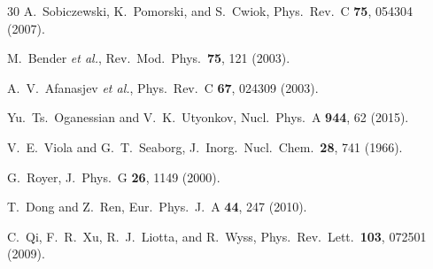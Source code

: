 \documentclass[aps,prc,twocolumn,showpacs,preprintnumbers,amsmath,amssymb]{revtex4-2}
\begin{document}
\begin{thebibliography}{30}
  A.~Sobiczewski, K.~Pomorski, and S.~Cwiok,
  Phys.\ Rev.\ C \textbf{75}, 054304 (2007).

  M.~Bender \emph{et al.},
  Rev.\ Mod.\ Phys.\ \textbf{75}, 121 (2003).

  A.~V.~Afanasjev \emph{et al.},
  Phys.\ Rev.\ C \textbf{67}, 024309 (2003).

  Yu.~Ts.~Oganessian and V.~K.~Utyonkov,
  Nucl.\ Phys.\ A \textbf{944}, 62 (2015).

  V.~E.~Viola and G.~T.~Seaborg,
  J.\ Inorg.\ Nucl.\ Chem.\ \textbf{28}, 741 (1966).

  G.~Royer,
  J.\ Phys.\ G \textbf{26}, 1149 (2000).

  T.~Dong and Z.~Ren,
  Eur.\ Phys.\ J.\ A \textbf{44}, 247 (2010).

  C.~Qi, F.~R.~Xu, R.~J.~Liotta, and R.~Wyss,
  Phys.\ Rev.\ Lett.\ \textbf{103}, 072501 (2009).

\end{thebibliography}
\end{document}
